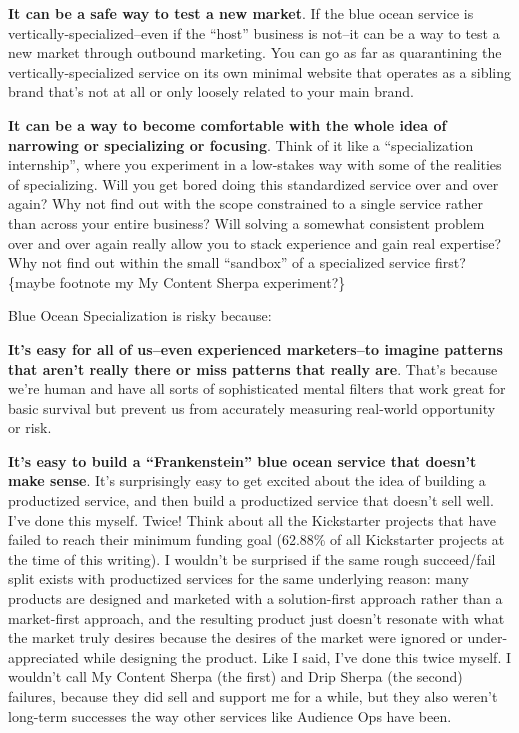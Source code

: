 \textbf{It can be a safe way to test a new market}. If the blue ocean service is vertically-specialized--even if the ``host'' business is not--it can be a way to test a new market through outbound marketing. You can go as far as quarantining the vertically-specialized service on its own minimal website that operates as a sibling brand that's not at all or only loosely related to your main brand.

\textbf{It can be a way to become comfortable with the whole idea of narrowing or specializing or focusing}. Think of it like a ``specialization internship'', where you experiment in a low-stakes way with some of the realities of specializing. Will you get bored doing this standardized service over and over again? Why not find out with the scope constrained to a single service rather than across your entire business? Will solving a somewhat consistent problem over and over again really allow you to stack experience and gain real expertise? Why not find out within the small ``sandbox'' of a specialized service first? \{maybe footnote my My Content Sherpa experiment?\}

Blue Ocean Specialization is risky because:

\textbf{It's easy for all of us--even experienced marketers--to imagine patterns that aren't really there or miss patterns that really are}. That's because we're human and have all sorts of sophisticated mental filters that work great for basic survival but prevent us from accurately measuring real-world opportunity or risk.

\textbf{It's easy to build a ``Frankenstein'' blue ocean service that doesn't make sense}. It's surprisingly easy to get excited about the idea of building a productized service, and then build a productized service that doesn't sell well. I've done this myself. Twice! Think about all the Kickstarter projects that have failed to reach their minimum funding goal (62.88\% of all Kickstarter projects at the time of this writing). I wouldn't be surprised if the same rough succeed/fail split exists with productized services for the same underlying reason: many products are designed and marketed with a solution-first approach rather than a market-first approach, and the resulting product just doesn't resonate with what the market truly desires because the desires of the market were ignored or under-appreciated while designing the product. Like I said, I've done this twice myself. I wouldn't call My Content Sherpa (the first) and Drip Sherpa (the second) failures, because they did sell and support me for a while, but they also weren't long-term successes the way other services like Audience Ops have been.

